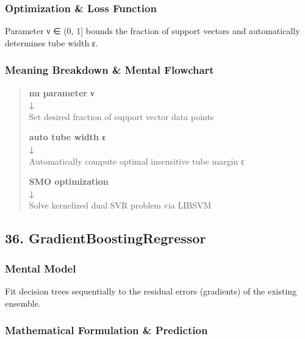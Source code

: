 \documentclass[
  10pt,
  letterpaper,
]{article}
\begin{document}
\hypertarget{optimization-loss-function-34}{%
\subsubsection{Optimization \& Loss Function}\label{optimization-loss-function-34}}

Parameter ν ∈ (0, 1{]} bounds the fraction of support vectors and automatically determines tube width ε.

\hypertarget{meaning-breakdown-mental-flowchart-34}{%
\subsubsection{Meaning Breakdown \& Mental Flowchart}\label{meaning-breakdown-mental-flowchart-34}}

\begin{quote}
\textbf{nu parameter ν\\
↓\\
}Set desired fraction of support vector data points

\textbf{auto tube width ε\\
↓\\
}Automatically compute optimal insensitive tube margin ε

\textbf{SMO optimization\\
↓\\
}Solve kernelized dual SVR problem via LIBSVM
\end{quote}

\hypertarget{gradientboostingregressor}{%
\subsection{36. GradientBoostingRegressor}\label{gradientboostingregressor}}

\hypertarget{mental-model-35}{%
\subsubsection{Mental Model}\label{mental-model-35}}

Fit decision trees sequentially to the residual errors (gradients) of the existing ensemble.

\hypertarget{mathematical-formulation-prediction-35}{%
\subsubsection{Mathematical Formulation \& Prediction}\label{mathematical-formulation-prediction-35}}
\end{document}
